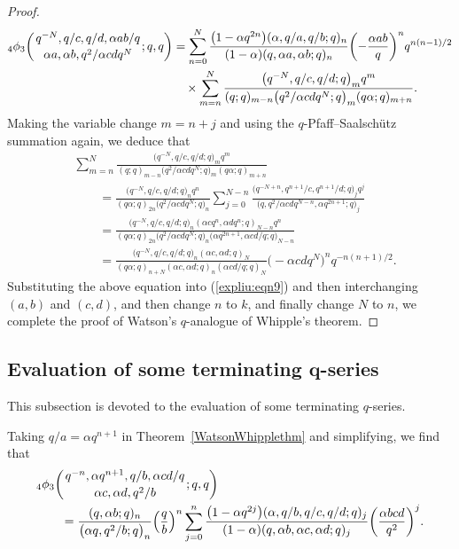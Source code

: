 \documentclass[10pt,a4paper]{amsart}
\numberwithin{equation}{section}
\begin{document}
\begin{proof}
\begin{align}
{_4\phi_3}\biggl({{q^{-N}, q/c, q/d, \alpha ab/q }\atop{\alpha a, \alpha b, q^2/{\alpha cd q^N}}}; q, q\biggr)
&{}=\sum_{n=0}^N \frac{\bigl(1-\alpha q^{2n}\bigr) (\alpha, q/a, q/b; q)_n}{(1-\alpha)(q, \alpha a, \alpha b; q)_n }\biggl(-\frac{\alpha ab}{q}\biggr)^n q^{n(n-1)/2}\nonumber\\
&{}\quad \times \sum_{m=n}^N \frac{\bigl(q^{-N}, q/c, q/d ; q\bigr)_m q^m}
{(q; q)_{m-n} \bigl(q^2/{\alpha cd q^N; q}\bigr)_{m} (q\alpha; q)_{m+n}}.\label{expliu:eqn9}
\end{align}
Making the variable change $m=n+j$ and using the $q$-Pfaff--Saalsch\"{u}tz summation again, we deduce that
\begin{align*}%
&\sum_{m=n}^N \frac{\bigl(q^{-N}, q/c, q/d ; q\bigr)_m q^m}
{(q; q)_{m-n} \bigl(q^2/{\alpha cd q^N}; q\bigr)_{m} (q\alpha; q)_{m+n}}\\
&\qquad{}=\frac{\bigl(q^{-N}, q/c, q/d; q\bigr)_n q^n}{(q\alpha; q)_{2n} \bigl(q^2/{\alpha cd q^N}; q\bigr)_n}
\sum_{j=0}^{N-n} \frac{\bigl(q^{-N+n}, q^{n+1}/c, q^{n+1}/d; q\bigr)_j q^{j}}
{\bigl(q, q^2/{\alpha cd q^{N-n}}, \alpha q^{2n+1}; q\bigr)_j}\nonumber\\	
&\qquad{}=\frac{\bigl(q^{-N}, q/c, q/d; q\bigr)_n (\alpha cq^n, \alpha dq^n; q)_{N-n} q^n}{(q\alpha; q)_{2n} \bigl(q^2/{\alpha cd q^N}; q\bigr)_n \bigl(\alpha q^{2n+1}, \alpha cd/q; q\bigr)_{N-n}}\nonumber\\
&\qquad{}=\frac{\bigl(q^{-N}, q/c, q/d; q\bigr)_n (\alpha c, \alpha d; q)_N}
{(q\alpha; q)_{n+N} (\alpha c, \alpha d; q)_n (\alpha cd/q; q)_N}
\bigl(-\alpha cd q^N\bigr)^n q^{-n(n+1)/2}. \nonumber
\end{align*}	
Substituting the above equation into (\ref{expliu:eqn9}) and then interchanging $(a, b)$ and $(c, d)$, and then change $n$ to $k$, and finally change $N$ to $n$, we complete the proof of Watson's $q$-analogue of Whipple's theorem.
\end{proof}

\subsection[Evaluation of some terminating q-series]{Evaluation of some terminating $\boldsymbol{q}$-series}
This subsection is devoted to the evaluation of some terminating $q$-series.

Taking $q/a=\alpha q^{n+1}$ in Theorem~\ref{WatsonWhipplethm} and simplifying, we find that \cite[equation~(2.1)]{Liu2013IJTN}
\begin{align}
	&{_4\phi_3}\biggl({{q^{-n}, \alpha q^{n+1}, q/b, \alpha cd/q }\atop{\alpha c, \alpha d, q^2/b}}; q, q\biggr)\nonumber\\
	&\qquad{}=\frac{(q, \alpha b; q)_n} {\bigl(\alpha q, q^2/b; q\bigr)_n } \Bigl(\frac{q} {b}\Bigr)^n \sum_{j=0}^n \frac{\bigl(1-\alpha q^{2j}\bigr) (\alpha, q/b, q/c, q/d; q)_j}
	{(1-\alpha)(q, \alpha b, \alpha c, \alpha d; q)_j}\biggl(\frac{\alpha bcd}{q^2}\biggr)^{j}.\label{newvalue:eqn1}
\end{align}
\end{document}
